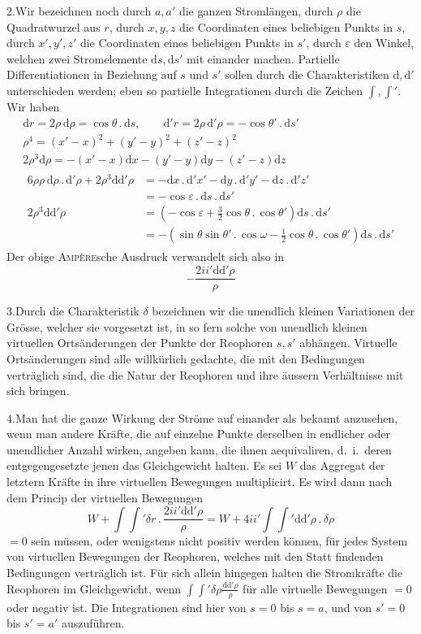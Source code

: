 2.\quad Wir bezeichnen noch durch $a,a'$ die ganzen Stromlängen, durch $\rho$ die Quadratwurzel aus $r$, durch $x,y,z$ die Coordinaten eines beliebigen Punkts in $s$, durch $x',y',z'$ die Coordinaten eines beliebigen Punkts in $s'$, durch $\varepsilon$ den
Winkel, welchen zwei Stromelemente $\mathrm ds,\mathrm ds'$ mit einander machen. Partielle Differentiationen in Beziehung auf $s$ und $s'$ sollen durch die Charakteristiken $\mathrm d,\mathrm d'$ unterschieden werden; eben so partielle Integrationen durch die Zeichen $\int,\int'$. Wir haben
\[
\begin{gathered}
\mathrm dr=2\rho\,\mathrm d\rho=\cos\theta\,.\,\mathrm ds,\qquad \mathrm d'r=2\rho\,\mathrm d'\rho=-\cos\theta'\,.\,\mathrm ds'\\
\rho^4=(x'-x)^2+(y'-y)^2+(z'-z)^2\\
2\rho^3\mathrm d\rho=-(x'-x)\mathrm dx-(y'-y)\mathrm dy-(z'-z)\mathrm dz\\
\begin{aligned}
6\rho\rho\,\mathrm d\rho\,.\,\mathrm d'\rho+2\rho^3\mathrm d\mathrm d'\rho
&=-\mathrm dx\,.\,\mathrm d'x'-\mathrm dy\,.\,\mathrm d'y'-\mathrm dz\,.\,\mathrm d'z'\\
&=-\cos\varepsilon\,.\,\mathrm ds\,.\,\mathrm ds'\\
2\rho^3\mathrm d\mathrm d'\rho&=(-\cos\varepsilon+\tfrac{3}{2}\cos\theta\,.\,\cos\theta')\mathrm ds\,.\,\mathrm ds'\\
&=-(\sin\theta\sin\theta'\,.\,\cos\omega-\tfrac{1}{2}\cos\theta\,.\,\cos\theta')\mathrm ds\,.\,\mathrm ds'
\end{aligned}
\end{gathered}
\]
Der obige \textsc{Ampère}sche Ausdruck verwandelt sich also in
\[
-\frac{2ii'\mathrm d\mathrm d'\rho}{\rho}
\]

3.\quad Durch die Charakteristik $\delta$ bezeichnen wir die unendlich kleinen Variationen der Grösse, welcher sie vorgesetzt ist, in so fern solche von unendlich kleinen virtuellen Ortsänderungen der Punkte der Reophoren $s,s'$ abhängen. Virtuelle Ortsänderungen sind alle willkürlich gedachte, die mit den Bedingungen verträglich sind, die die Natur der Reophoren und ihre äussern Verhältnisse mit sich bringen.

4.\quad Man hat die ganze Wirkung der Ströme auf einander als bekannt anzusehen, wenn man andere Kräfte, die auf einzelne Punkte derselben in endlicher oder unendlicher Anzahl wirken, angeben kann, die ihnen aequivaliren, d.\ i.\ deren entgegengesetzte jenen das Gleichgewicht halten. Es sei $W$ das Aggregat der letztern Kräfte in ihre virtuellen Bewegungen multiplicirt. Es wird dann nach dem Princip der virtuellen Bewegungen
\[
W+\int\int'\delta r\,.\,\frac{2ii'\mathrm d\mathrm d'\rho}{\rho}=W+4ii'\int\int'\mathrm d\mathrm d'\rho\,.\,\delta\rho
\]
$=0$ sein müssen, oder wenigstens nicht positiv werden können, für jedes System von virtuellen Bewegungen der Reophoren, welches mit den Statt findenden Bedingungen verträglich ist. Für sich allein hingegen halten die Stromkräfte die Reophoren im Gleichgewicht, wenn $\int\int'\delta\rho\frac{\mathrm d\mathrm d'\rho}{\rho}$ für alle virtuelle Bewegungen $=0$ oder negativ ist. Die Integrationen sind hier von $s=0$ bis $s=a$, und von $s'=0$ bis $s'=a'$ auszuführen.


